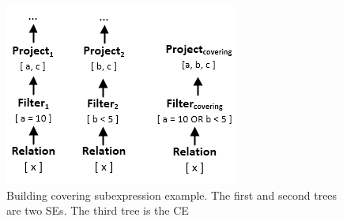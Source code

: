 \begin{figure}[!htb]
	\centering
	\includegraphics[scale=0.75]{figures/covering}
	\caption{Building covering subexpression example. The first and second trees are two SEs. The third tree is the CE}
   	\label{fig:covering}
\end{figure}